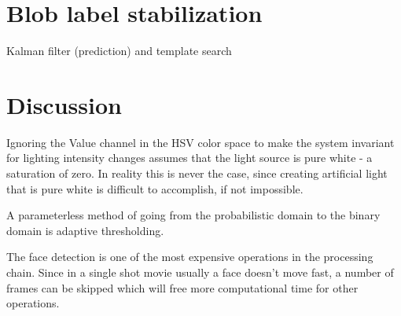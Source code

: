 \section{Blob label stabilization}
Kalman filter (prediction) and template search

\section{Discussion}
Ignoring the Value channel in the HSV color space to make the system invariant for lighting intensity changes assumes that the light source is pure white - a saturation of zero. In reality this is never the case, since creating artificial light that is pure white is difficult to accomplish, if not impossible.

A parameterless method of going from the probabilistic domain to the binary domain is adaptive thresholding.

The face detection is one of the most expensive operations in the processing chain. Since in a single shot movie usually a face doesn't move fast, a number of frames can be skipped which will free more computational time for other operations.

